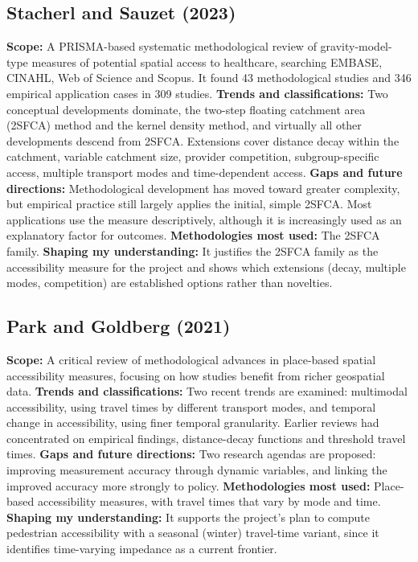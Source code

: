 \documentclass[journal]{IEEEtran}
\begin{document}
\subsection{Stacherl and Sauzet (2023) \cite{stacherl2023}}
\textbf{Scope:} A PRISMA-based systematic methodological review of gravity-model-type measures of potential spatial access to healthcare, searching EMBASE, CINAHL, Web of Science and Scopus. It found 43 methodological studies and 346 empirical application cases in 309 studies.
\textbf{Trends and classifications:} Two conceptual developments dominate, the two-step floating catchment area (2SFCA) method and the kernel density method, and virtually all other developments descend from 2SFCA. Extensions cover distance decay within the catchment, variable catchment size, provider competition, subgroup-specific access, multiple transport modes and time-dependent access.
\textbf{Gaps and future directions:} Methodological development has moved toward greater complexity, but empirical practice still largely applies the initial, simple 2SFCA. Most applications use the measure descriptively, although it is increasingly used as an explanatory factor for outcomes.
\textbf{Methodologies most used:} The 2SFCA family.
\textbf{Shaping my understanding:} It justifies the 2SFCA family as the accessibility measure for the project and shows which extensions (decay, multiple modes, competition) are established options rather than novelties.

\subsection{Park and Goldberg (2021) \cite{park2021}}
\textbf{Scope:} A critical review of methodological advances in place-based spatial accessibility measures, focusing on how studies benefit from richer geospatial data.
\textbf{Trends and classifications:} Two recent trends are examined: multimodal accessibility, using travel times by different transport modes, and temporal change in accessibility, using finer temporal granularity. Earlier reviews had concentrated on empirical findings, distance-decay functions and threshold travel times.
\textbf{Gaps and future directions:} Two research agendas are proposed: improving measurement accuracy through dynamic variables, and linking the improved accuracy more strongly to policy.
\textbf{Methodologies most used:} Place-based accessibility measures, with travel times that vary by mode and time.
\textbf{Shaping my understanding:} It supports the project's plan to compute pedestrian accessibility with a seasonal (winter) travel-time variant, since it identifies time-varying impedance as a current frontier.
\end{document}
